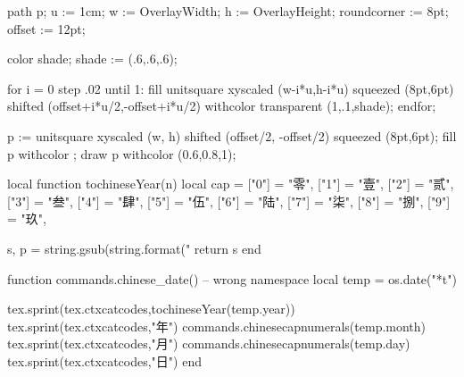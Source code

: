     path p;
    u := 1cm; w := OverlayWidth; h := OverlayHeight;
    roundcorner := 8pt; offset := 12pt;

    color shade;
    shade := (.6,.6,.6);

    for i = 0 step .02 until 1:
        fill unitsquare xyscaled (w-i*u,h-i*u) squeezed (8pt,6pt)
             shifted (offset+i*u/2,-offset+i*u/2)
             withcolor transparent (1,.1,shade);
    endfor;

    p := unitsquare xyscaled (w, h) shifted (offset/2, -offset/2) squeezed (8pt,6pt);
    fill p withcolor ;
    draw p withcolor (0.6,0.8,1);
\stopuniqueMPgraphic
{}%
\def\startEnglish{\dostartEnglish}

\long{}

\def\startEnglishWithoutWhiteSpace{\dostartEnglishWithoutWhiteSpace}

\long\def\dostartEnglishWithoutWhiteSpace#1\stopEnglishWithoutWhiteSpace{%
{\setscript[no]
\mainlanguage[en]
\setupindenting[no]%
\setupwhitespace[medium]%
\setupinterlinespace[medium]%
\blank[1ex]
#1%
\blank[1ex]}
}
\startluacode
local function tochineseYear(n)
	local cap = {
		["0"] = "零",
		["1"] = "壹",
		["2"] = "贰",
		["3"] = "叁",
		["4"] = "肆",
		["5"] = "伍",
		["6"] = "陆",
		["7"] = "柒",
		["8"] = "捌",
		["9"] = "玖",
	}

	s, p = string.gsub(string.format("%
	return s
end

function commands.chinese_date() -- wrong namespace
	local temp = os.date("*t")

	tex.sprint(tex.ctxcatcodes,tochineseYear(temp.year))
	tex.sprint(tex.ctxcatcodes,"年")
	commands.chinesecapnumerals(temp.month)
	tex.sprint(tex.ctxcatcodes,"月")
	commands.chinesecapnumerals(temp.day)
	tex.sprint(tex.ctxcatcodes,"日")
end
\stopluacode


\chardef\kindofpagetextareas\plusone

\let\stdfootnote\footnote
\def\footnote#1{%
\stdfootnote{\setscript[hanzi]#1}%
}

\setupcaptions[align={broad,middle}]

\problem{}
\stopenvironment

